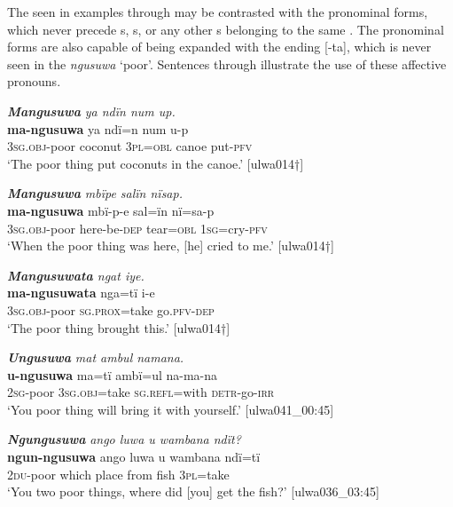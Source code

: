 The  seen in examples  through  may be contrasted with the pronominal forms, which never precede s, s, or any other s belonging to the same . The pronominal forms are also capable of being expanded with the ending [-ta], which is never seen in the  \textit{ngusuwa} ‘poor’. Sentences  through  illustrate the use of these affective pronouns.

\ea%
    \label{ex:pron:100}
          \textbf{\textit{Mangusuwa}} \textit{ya ndïn num up.}\\
\gll    \textbf{ma-ngusuwa}  ya      ndï=n    num  u-p\\
    3\textsc{sg.obj-}poor  coconut  3\textsc{pl=obl}  canoe  put-\textsc{pfv}\\
\glt `The poor thing put coconuts in the canoe.’ [ulwa014†]
\z

\ea%
    \label{ex:pron:101}
          \textbf{\textit{Mangusuwa}} \textit{mbïpe salïn nïsap.}\\
\gll    \textbf{ma-ngusuwa}  mbï-p-e    sal=ïn    nï=sa-p\\
    3\textsc{sg.obj-}poor  here-be-\textsc{dep}  tear=\textsc{obl}  1\textsc{sg}=cry-\textsc{pfv}\\
\glt `When the poor thing was here, [he] cried to me.’ [ulwa014†]
\z

\ea%
    \label{ex:pron:102}
          \textit{\textbf{Mangusuwata} ngat iye.}\\
\gll    \textbf{ma-ngusuwata}  nga=tï      i-e\\
    3\textsc{sg.obj-}poor    \textsc{sg.prox}=take  go.\textsc{pfv-dep}\\
\glt `The poor thing brought this.’ [ulwa014†]
\z

\ea%
    \label{ex:pron:103}
          \textbf{\textit{Ungusuwa}} \textit{mat ambul namana.}\\
\gll    \textbf{u-ngusuwa}  ma=tï    ambï=ul      na-ma-na\\
    2\textsc{sg-}poor    3\textsc{sg.obj}=take  \textsc{sg.refl}=with  \textsc{detr-}go-\textsc{irr}\\
\glt `You poor thing will bring it with yourself.’ [ulwa041\_00:45]
\z

\ea%
    \label{ex:pron:104}
          \textbf{\textit{Ngungusuwa}} \textit{ango luwa u wambana ndït?}\\
\gll    \textbf{ngun-ngusuwa}  ango  luwa  u    wambana  ndï=tï\\
    \textsc{2du-}poor      which  place  from  fish    3\textsc{pl}=take\\
\glt `You two poor things, where did [you] get the fish?’ [ulwa036\_03:45]
\z

